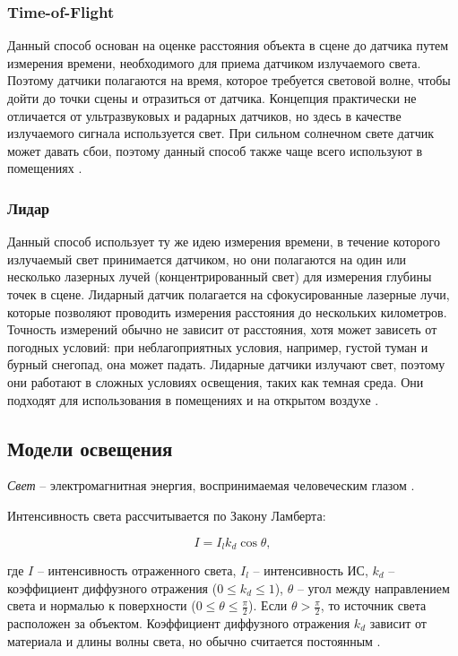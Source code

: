 \subsubsection*{Time-of-Flight}

Данный способ основан на оценке расстояния объекта в сцене до датчика путем измерения времени, необходимого для приема датчиком излучаемого света. Поэтому датчики полагаются на время, которое требуется световой волне, чтобы дойти до точки сцены и отразиться от датчика. Концепция практически не отличается от ультразвуковых и радарных датчиков, но здесь в качестве излучаемого сигнала используется свет. При сильном солнечном свете датчик может давать сбои, поэтому данный способ также чаще всего используют в помещениях \cite{rgbd}.

\subsubsection*{Лидар}

Данный способ использует ту же идею измерения времени, в течение которого излучаемый свет принимается датчиком, но они полагаются на один или несколько лазерных лучей (концентрированный свет) для измерения глубины точек в сцене. Лидарный датчик полагается на сфокусированные лазерные лучи, которые позволяют проводить измерения расстояния до нескольких километров. Точность измерений обычно не зависит от расстояния, хотя может зависеть от погодных условий: при неблагоприятных условия, например, густой туман и бурный снегопад, она может падать. Лидарные датчики излучают свет, поэтому они работают в сложных условиях освещения, таких как темная среда. Они подходят для использования в помещениях и на открытом воздухе \cite{rgbd}.

\subsection{Модели освещения}

\textit{Свет} -- электромагнитная энергия, воспринимаемая человеческим глазом \cite{big_rus_enc}.

Интенсивность света рассчитывается по Закону Ламберта:

\begin{equation}
	I = I_l k_d \cos \theta,
\end{equation}

где $I$ -- интенсивность отраженного света, $I_l$ -- интенсивность ИС, $k_d$ -- коэффициент диффузного отражения ($0 \leq k_d \leq 1$), $\theta$ -- угол между направлением света и нормалью к поверхности ($0 \leq \theta \leq \frac{\pi}{2}$). Если $\theta > \frac{\pi}{2}$, то источник света расположен за объектом. Коэффициент диффузного отражения $k_d$ зависит от материала и длины волны света, но обычно считается постоянным \cite{rogers}.


